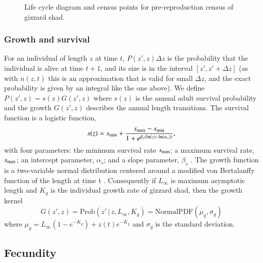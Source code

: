 \documentclass[preprint,review,12pt,authoryear]{elsarticle}
\def\ds{\displaystyle}
\begin{document}
\begin{figure}
\begin{center}
\end{center}
 \caption{\small{Life cycle diagram and census points for pre-reproduction census of gizzard shad.}}
 \label{life_cycle}
\end{figure}

\subsubsection{Growth and survival}
For an individual of length $z$ at time $t$, $P(z',z)\Delta z$ is the probability that the individual is alive at time $t+1$, and its size is in the interval $[z', z' + \Delta z]$ (as with $n(z,t)$ this is an approximation that is valid for small $\Delta z$, and the exact probability is given by an integral like the one above). We define $P(z', z) = s(z)G(z',z)$ where $s(z)$ is the annual adult survival probability and the growth $G(z',z)$ describes the annual length transitions. 
The survival function is a logistic function,
\begin{equation}\label{eq:surv}
s(z) = s_{\rm min} + \frac{s_{\rm max}-s_{\rm min}}{1+e^{\beta_s(\ln(z)-\ln(\alpha_s))}},
\end{equation}
with four parameters: the minimum survival rate $s_{\rm min}$; a maximum survival rate, $s_{\rm max}$; an intercept parameter, $\alpha_{s}$; and a slope parameter, $\beta_{s}$ \citep{bolker2008ecological}.  
The growth function is a two-variable normal distribution centered around a modified von Bertalanffy function of the length at time t \citep{erickson2017integral}.  
Consequently if $L_\infty$ is maximum asymptotic length and $K_g$ is the individual growth rate of gizzard shad, then the growth kernel
$$\ds G(z',z) = \mathrm{Prob}(z' \, | \,  z, L_{\infty}, K_g) = \mathrm{Normal PDF}(\mu_g, \sigma_g)$$
where $\mu_g =  L_{\infty} \left(1-e^{-K_g} \right) + z(t)e^{-K_g}$ and $\sigma_g$ is the standard deviation.

\subsection{Fecundity}
\end{document}
